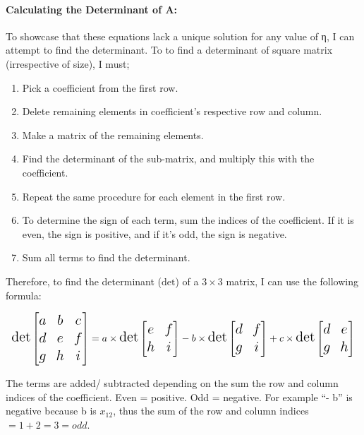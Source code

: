 \documentclass[
]{article}
\providecommand{\tightlist}{%
  \setlength{\itemsep}{0pt}\setlength{\parskip}{0pt}}
\begin{document}
\paragraph{Calculating the Determinant of
A:}\label{calculating-the-determinant-of-a}

To showcase that these equations lack a unique solution for any value of
η, I can attempt to find the determinant. To to find a determinant of
square matrix (irrespective of size), I must;

\begin{enumerate}
\def\labelenumi{\arabic{enumi}.}
\tightlist
\item
  Pick a coefficient from the first row.
\item
  Delete remaining elements in coefficient's respective row and column.
\item
  Make a matrix of the remaining elements.
\item
  Find the determinant of the sub-matrix, and multiply this with the
  coefficient.
\item
  Repeat the same procedure for each element in the first row.
\item
  To determine the sign of each term, sum the indices of the
  coefficient. If it is even, the sign is positive, and if it's odd, the
  sign is negative.
\item
  Sum all terms to find the determinant.
\end{enumerate}

Therefore, to find the determinant (\(\text{det}\)) of a \(3 \times 3\)
matrix, I can use the following formula:

\[
\Large
\text{det} \begin{bmatrix} a & b & c \\ d & e & f \\ g & h & i \end{bmatrix} = a \times \text{det} \begin{bmatrix} e & f \\ h & i \end{bmatrix} - b \times \text{det} \begin{bmatrix} d & f \\ g & i \end{bmatrix} + c \times \text{det} \begin{bmatrix} d & e \\ g & h \end{bmatrix}
\]

The terms are added/ subtracted depending on the sum the row and column
indices of the coefficient. Even = positive. Odd = negative. For example
``- b'' is negative because b is \(x_{12}\), thus the sum of the row and
column indices \(= 1+2 = 3 = odd\).
\end{document}
